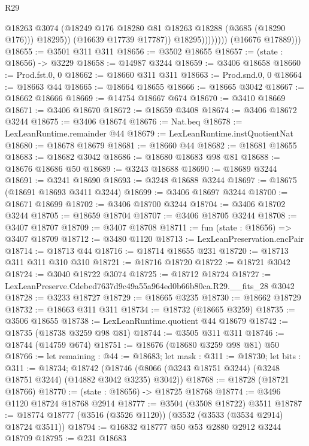 \begin{lexlean}{R29}
\begin{coremodule}
                              @18263
                              @3074
                              (@18249 @176 @18280 @81 @18263 @18288 (@3685 (@18290 @176)))
                              @18295))
                          (@16639 @17739 @17787))
                        @18295))))))))
        (@16676 @17889)))
@18655 := @3501 @311 @311
@18656 := @3502 @18655
@18657 := (state : @18656) -> @3229
@18658 := @14987 @3244
@18659 := @3406 @18658
@18660 := Prod.fst.{0, 0}
@18662 := @18660 @311 @311
@18663 := Prod.snd.{0, 0}
@18664 := @18663 @44
@18665 := @18664 @18655
@18666 := @18665 @3042
@18667 := @18662 @18666
@18669 := @14754 @18667 @674
@18670 := @3410 @18669
@18671 := @3406 @18670
@18672 := @18659 @3408
@18674 := @3406 @18672 @3244
@18675 := @3406 @18674
@18676 := Nat.beq
@18678 := LexLeanRuntime.remainder @44
@18679 := LexLeanRuntime.instQuotientNat
@18680 := @18678 @18679
@18681 := @18660 @44
@18682 := @18681 @18655
@18683 := @18682 @3042
@18686 := @18680 @18683 @98 @81
@18688 := @18676 @18686 @50
@18689 := @3243 @18688
@18690 := @18689 @3244
@18691 := @3241 @18690
@18693 := @3248 @18688 @3244
@18697 := @18675 (@18691 @18693 @3411 @3244)
@18699 := @3406 @18697 @3244
@18700 := @18671 @18699
@18702 := @3406 @18700 @3244
@18704 := @3406 @18702 @3244
@18705 := @18659 @18704
@18707 := @3406 @18705 @3244
@18708 := @3407 @18707
@18709 := @3407 @18708
@18711 := fun (state : @18656) => @3407 @18709
@18712 := @3480 @1120
@18713 := LexLeanPreservation.encPair
@18714 := @18713 @44
@18716 := @18714 @18655 @231
@18720 := @18713 @311 @311 @310 @310
@18721 := @18716 @18720
@18722 := @18721 @3042
@18724 := @3040 @18722 @3074
@18725 := @18712 @18724
@18727 := LexLeanPreserve.Cdebed7637d9c49a55a964ed0b66b80ca.R29.__fits_28 @3042
@18728 := @3233 @18727
@18729 := @18665 @3235
@18730 := @18662 @18729
@18732 := @18663 @311 @311
@18734 := @18732 (@18665 @3259)
@18735 := @3506 @18655
@18738 := LexLeanRuntime.quotient @44 @18679
@18742 := @18735 (@18738 @3259 @98 @81)
@18744 := @3505 @311 @311
@18746 := @18744 (@14759 @674)
@18751 := @18676 (@18680 @3259 @98 @81) @50
@18766 := let remaining : @44 := @18683;
  let mask : @311 := @18730;
  let bits : @311 := @18734;
  @18742 (@18746 (@8066 (@3243 @18751 @3244) (@3248 @18751 @3244) (@14882 @3042 @3235) @3042))
@18768 := @18728 (@18721 @18766)
@18770 := (state : @18656) -> @18725 @18768
@18774 := @3496 @1120 @18724 @18768 @2914
@18777 := @3504 (@3508 @18722) @3511
@18787 := @18774 @18777 (@3516 (@3526 @1120)) (@3532 (@3533 (@3534 @2914) @18724 @3511))
@18794 := @16832 @18777 @50 @53 @2880 @2912 @3244 @18709
@18795 := @231 @18683

\end{coremodule}
\end{lexlean}
